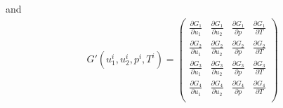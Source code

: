 \documentclass{article}
\begin{document}
and 
 \begin{align*}
G'(u_1^i,u_2^i,p^i,T^i) = \begin{pmatrix}
\frac{\partial G_1}{\partial u_1}&\frac{\partial G_1}{\partial u_2}&\frac{\partial G_1}{\partial p}&\frac{\partial G_1}{\partial T}\\
\frac{\partial G_2}{\partial u_1}&\frac{\partial G_2}{\partial u_2}&\frac{\partial G_2}{\partial p}&\frac{\partial G_2}{\partial T}\\
\frac{\partial G_3}{\partial u_1}&\frac{\partial G_3}{\partial u_2}&\frac{\partial G_3}{\partial p}&\frac{\partial G_3}{\partial T}\\
\frac{\partial G_4}{\partial u_1}&\frac{\partial G_4}{\partial u_2}&\frac{\partial G_4}{\partial p}&\frac{\partial G_4}{\partial T}\\
\end{pmatrix}
 \end{align*}
\end{document}
